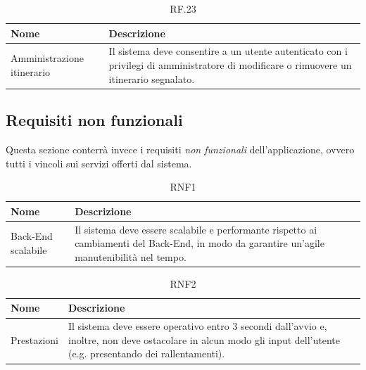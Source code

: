 \documentclass{natourDoc}
\begin{document}
\begin{table}[H]
	\centering
	\begin{tabular}{ |p{5cm}|p{10.3cm}| }
		\hline
		\rowcolor{PineGreen!70}
		\textbf{Nome}              & \textbf{Descrizione}                                                                                \\
		\hline
		Amministrazione itinerario & Il sistema deve consentire a un utente autenticato con i privilegi di amministratore di modificare o
		rimuovere un itinerario segnalato.                                                                                               \\
		\hline
	\end{tabular}
	\caption{RF.23}
\end{table}

\newpage
\subsection{Requisiti non funzionali}
Questa sezione conterrà invece i requisiti \textit{non funzionali} dell'applicazione, ovvero tutti i vincoli sui servizi offerti dal sistema.

\begin{table}[H]
	\centering
	\begin{tabular}{ |p{5cm}|p{10.3cm}| }
		\hline
		\rowcolor{PineGreen!70}
		\textbf{Nome}      & \textbf{Descrizione}                                                                 \\
		\hline
		Back-End scalabile & Il sistema deve essere scalabile e performante rispetto ai cambiamenti del Back-End,
		in modo da garantire un'agile manutenibilità nel tempo.                                                   \\
		\hline
	\end{tabular}
	\caption{RNF1}
\end{table}

\begin{table}[H]
	\centering
	\begin{tabular}{ |p{5cm}|p{10.3cm}| }
		\hline
		\rowcolor{PineGreen!70}
		\textbf{Nome} & \textbf{Descrizione}                                                                           \\
		\hline
		Prestazioni   & Il sistema deve essere operativo entro 3 secondi dall'avvio e, inoltre, non deve ostacolare in
		alcun modo gli input dell'utente (e.g. presentando dei rallentamenti).                                         \\
		\hline
	\end{tabular}
	\caption{RNF2}
\end{table}
\end{document}
